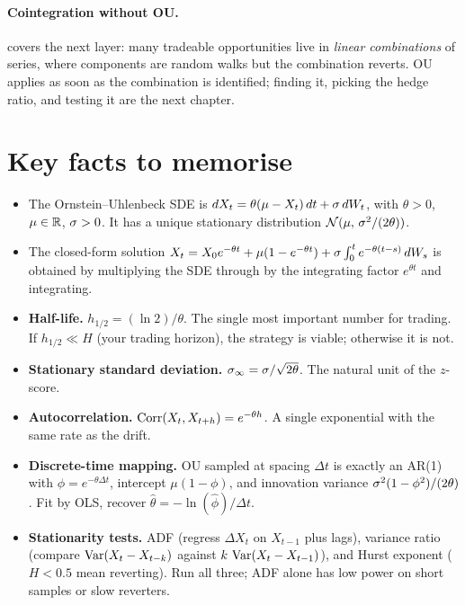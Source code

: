 \paragraph{Cointegration without OU.}
 covers the next layer: many
tradeable opportunities live in \emph{linear combinations} of
series, where components are random walks but the combination
reverts. OU applies as soon as the combination is identified;
finding it, picking the hedge ratio, and testing it are the next
chapter.

\section{Key facts to memorise}
\label{sec:ch9_keyfacts}

\begin{itemize}
  \item The Ornstein--Uhlenbeck SDE is
  $dX_t = \theta(\mu - X_t)\,dt + \sigma\,dW_t$, with
  $\theta > 0$, $\mu \in \mathbb{R}$, $\sigma > 0$. It has a unique
  stationary distribution
  $\mathcal{N}(\mu,\, \sigma^2/(2\theta))$.
  \item The closed-form solution
  $X_t = X_0 e^{-\theta t} + \mu(1 - e^{-\theta t})
       + \sigma \int_0^t e^{-\theta(t-s)}\, dW_s$
  is obtained by multiplying the SDE through by the integrating
  factor $e^{\theta t}$ and integrating.
  \item \textbf{Half-life.} $h_{1/2} = (\ln 2)/\theta$. The
  single most important number for trading. If
  $h_{1/2} \ll H$ (your trading horizon), the strategy is
  viable; otherwise it is not.
  \item \textbf{Stationary standard deviation.}
  $\sigma_\infty = \sigma/\sqrt{2\theta}$. The natural unit of
  the $z$-score.
  \item \textbf{Autocorrelation.}
  $\operatorname{Corr}(X_t, X_{t+h}) = e^{-\theta h}$. A single exponential
  with the same rate as the drift.
  \item \textbf{Discrete-time mapping.} OU sampled at spacing
  $\Delta t$ is exactly an AR(1) with $\phi = e^{-\theta \Delta t}$,
  intercept $\mu(1 - \phi)$, and innovation variance
  $\sigma^2(1 - \phi^2)/(2\theta)$. Fit by OLS, recover
  $\hat\theta = -\ln(\hat\phi)/\Delta t$.
  \item \textbf{Stationarity tests.} ADF (regress
  $\Delta X_t$ on $X_{t-1}$ plus lags), variance ratio (compare
  $\operatorname{Var}(X_t - X_{t-k})$ against $k\,\operatorname{Var}(X_t - X_{t-1})$), and
  Hurst exponent ($H < 0.5$ mean reverting). Run all three;
  ADF alone has low power on short samples or slow reverters.

\end{itemize}
